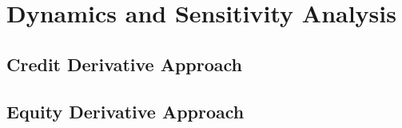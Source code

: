 \chapter{Dynamics and Sensitivity Analysis}

\section{Credit Derivative Approach}

\section{Equity Derivative Approach}


